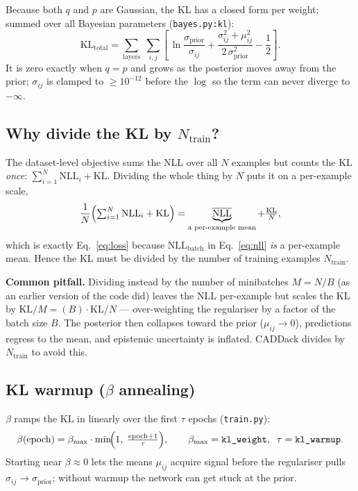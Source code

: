 \documentclass[11pt,a4paper]{article}
\newcommand{\code}[1]{\texttt{#1}}
\newcommand{\KL}{\mathrm{KL}}
\newcommand{\NLL}{\mathrm{NLL}}
\begin{document}
Because both $q$ and $p$ are Gaussian, the KL has a closed form per weight; summed
over all Bayesian parameters (\code{bayes.py:kl}):
\begin{equation}
\KL_{\text{total}}
= \sum_{\text{layers}}\;\sum_{i,j}
  \left[\,
    \ln\frac{\sigma_{\text{prior}}}{\sigma_{ij}}
    + \frac{\sigma_{ij}^2 + \mu_{ij}^2}{2\,\sigma_{\text{prior}}^2}
    - \frac{1}{2}
  \right].
\label{eq:kl}
\end{equation}
It is zero exactly when $q = p$ and grows as the posterior moves away from the prior;
$\sigma_{ij}$ is clamped to $\ge 10^{-12}$ before the $\log$ so the term can never
diverge to $-\infty$.

\subsection{Why divide the KL by $N_{\text{train}}$?}
\label{sec:scaling}

The dataset-level objective sums the NLL over all $N$ examples but counts the KL
\emph{once}: $\sum_{i=1}^{N}\NLL_i + \KL$. Dividing the whole thing by $N$ puts it on
a per-example scale,
\begin{equation}
\frac{1}{N}\Bigl(\textstyle\sum_{i=1}^{N}\NLL_i + \KL\Bigr)
= \underbrace{\overline{\NLL}}_{\text{a per-example mean}} + \frac{\KL}{N},
\end{equation}
which is exactly Eq.~\eqref{eq:loss} because $\NLL_{\text{batch}}$ in
Eq.~\eqref{eq:nll} \emph{is} a per-example mean. Hence the KL must be divided by the
number of training examples $N_{\text{train}}$.

\medskip
\noindent\textbf{Common pitfall.} Dividing instead by the number of minibatches
$M = N/B$ (as an earlier version of the code did) leaves the NLL per-example but
scales the KL by $\KL/M = (B)\cdot \KL/N$ --- over-weighting the regulariser by a
factor of the batch size $B$. The posterior then collapses toward the prior
($\mu_{ij}\to 0$), predictions regress to the mean, and epistemic uncertainty is
inflated. CADDack divides by $N_{\text{train}}$ to avoid this.

\subsection{KL warmup ($\beta$ annealing)}

$\beta$ ramps the KL in linearly over the first $\tau$ epochs
(\code{train.py}):
\begin{equation}
\beta(\text{epoch}) = \beta_{\max}\cdot\min\!\Bigl(1,\; \tfrac{\text{epoch}+1}{\tau}\Bigr),
\qquad \beta_{\max}=\code{kl\_weight},\;\; \tau=\code{kl\_warmup}.
\end{equation}
Starting near $\beta\approx 0$ lets the means $\mu_{ij}$ acquire signal before the
regulariser pulls $\sigma_{ij}\to\sigma_{\text{prior}}$; without warmup the network
can get stuck at the prior.
\end{document}
